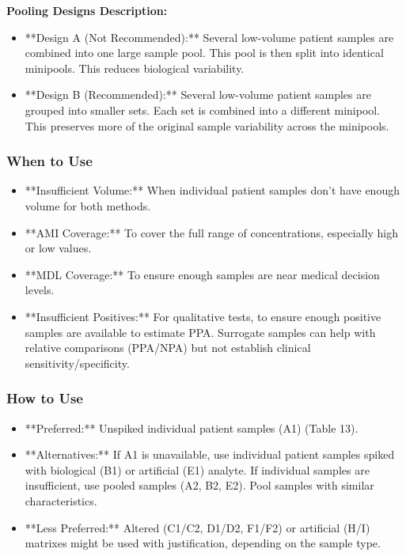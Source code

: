 \documentclass{article}
\begin{document}
\textbf{Pooling Designs Description:}
\begin{itemize}
    \item **Design A (Not Recommended):** Several low-volume patient samples are combined into one large sample pool. This pool is then split into identical minipools. This reduces biological variability.
    \item **Design B (Recommended):** Several low-volume patient samples are grouped into smaller sets. Each set is combined into a different minipool. This preserves more of the original sample variability across the minipools.
\end{itemize}

\subsubsection{When to Use}
\begin{itemize}
    \item **Insufficient Volume:** When individual patient samples don't have enough volume for both methods.
    \item **AMI Coverage:** To cover the full range of concentrations, especially high or low values.
    \item **MDL Coverage:** To ensure enough samples are near medical decision levels.
    \item **Insufficient Positives:** For qualitative tests, to ensure enough positive samples are available to estimate PPA. Surrogate samples can help with relative comparisons (PPA/NPA) but not establish clinical sensitivity/specificity.
\end{itemize}

\subsubsection{How to Use}
\begin{itemize}
    \item **Preferred:** Unspiked individual patient samples (A1) (Table 13).
    \item **Alternatives:** If A1 is unavailable, use individual patient samples spiked with biological (B1) or artificial (E1) analyte. If individual samples are insufficient, use pooled samples (A2, B2, E2). Pool samples with similar characteristics.
    \item **Less Preferred:** Altered (C1/C2, D1/D2, F1/F2) or artificial (H/I) matrixes might be used with justification, depending on the sample type.
\end{itemize}
\end{document}
